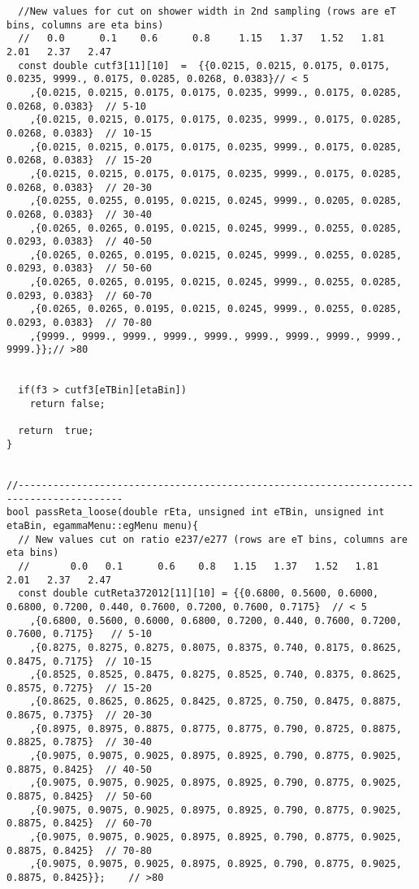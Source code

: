 \begin{lstlisting}
  //New values for cut on shower width in 2nd sampling (rows are eT bins, columns are eta bins)
  //   0.0      0.1    0.6      0.8     1.15   1.37   1.52   1.81    2.01   2.37   2.47
  const double cutf3[11][10]  =  {{0.0215, 0.0215, 0.0175, 0.0175, 0.0235, 9999., 0.0175, 0.0285, 0.0268, 0.0383}// < 5
	,{0.0215, 0.0215, 0.0175, 0.0175, 0.0235, 9999., 0.0175, 0.0285, 0.0268, 0.0383}  // 5-10
	,{0.0215, 0.0215, 0.0175, 0.0175, 0.0235, 9999., 0.0175, 0.0285, 0.0268, 0.0383}  // 10-15
	,{0.0215, 0.0215, 0.0175, 0.0175, 0.0235, 9999., 0.0175, 0.0285, 0.0268, 0.0383}  // 15-20
	,{0.0215, 0.0215, 0.0175, 0.0175, 0.0235, 9999., 0.0175, 0.0285, 0.0268, 0.0383}  // 20-30
	,{0.0255, 0.0255, 0.0195, 0.0215, 0.0245, 9999., 0.0205, 0.0285, 0.0268, 0.0383}  // 30-40
	,{0.0265, 0.0265, 0.0195, 0.0215, 0.0245, 9999., 0.0255, 0.0285, 0.0293, 0.0383}  // 40-50
	,{0.0265, 0.0265, 0.0195, 0.0215, 0.0245, 9999., 0.0255, 0.0285, 0.0293, 0.0383}  // 50-60
	,{0.0265, 0.0265, 0.0195, 0.0215, 0.0245, 9999., 0.0255, 0.0285, 0.0293, 0.0383}  // 60-70
	,{0.0265, 0.0265, 0.0195, 0.0215, 0.0245, 9999., 0.0255, 0.0285, 0.0293, 0.0383}  // 70-80
	,{9999., 9999., 9999., 9999., 9999., 9999., 9999., 9999., 9999., 9999.}};// >80


  if(f3 > cutf3[eTBin][etaBin])
    return false;
    
  return  true;
}


//----------------------------------------------------------------------------------------
bool passReta_loose(double rEta, unsigned int eTBin, unsigned int etaBin, egammaMenu::egMenu menu){
  // New values cut on ratio e237/e277 (rows are eT bins, columns are eta bins)
  //       0.0   0.1      0.6    0.8   1.15   1.37   1.52   1.81    2.01   2.37   2.47
  const double cutReta372012[11][10] = {{0.6800, 0.5600, 0.6000, 0.6800, 0.7200, 0.440, 0.7600, 0.7200, 0.7600, 0.7175}  // < 5        
	,{0.6800, 0.5600, 0.6000, 0.6800, 0.7200, 0.440, 0.7600, 0.7200, 0.7600, 0.7175}   // 5-10
	,{0.8275, 0.8275, 0.8275, 0.8075, 0.8375, 0.740, 0.8175, 0.8625, 0.8475, 0.7175}  // 10-15
	,{0.8525, 0.8525, 0.8475, 0.8275, 0.8525, 0.740, 0.8375, 0.8625, 0.8575, 0.7275}  // 15-20
	,{0.8625, 0.8625, 0.8625, 0.8425, 0.8725, 0.750, 0.8475, 0.8875, 0.8675, 0.7375}  // 20-30
	,{0.8975, 0.8975, 0.8875, 0.8775, 0.8775, 0.790, 0.8725, 0.8875, 0.8825, 0.7875}  // 30-40
	,{0.9075, 0.9075, 0.9025, 0.8975, 0.8925, 0.790, 0.8775, 0.9025, 0.8875, 0.8425}  // 40-50
	,{0.9075, 0.9075, 0.9025, 0.8975, 0.8925, 0.790, 0.8775, 0.9025, 0.8875, 0.8425}  // 50-60
	,{0.9075, 0.9075, 0.9025, 0.8975, 0.8925, 0.790, 0.8775, 0.9025, 0.8875, 0.8425}  // 60-70
	,{0.9075, 0.9075, 0.9025, 0.8975, 0.8925, 0.790, 0.8775, 0.9025, 0.8875, 0.8425}  // 70-80
	,{0.9075, 0.9075, 0.9025, 0.8975, 0.8925, 0.790, 0.8775, 0.9025, 0.8875, 0.8425}};    // >80


\end{lstlisting}
